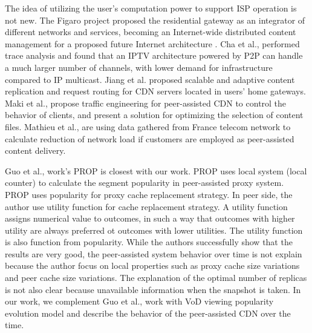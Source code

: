\documentclass[10pt,final,journal,a4paper]{IEEEtran}
\begin{document}
The idea of utilizing the user's computation power to support ISP operation is not new.  
The Figaro project \cite{figaro} proposed the residential gateway as an integrator of different networks and services, becoming an Internet-wide distributed content management for a proposed future Internet architecture \cite{figaro}.  
Cha et al.,\cite{Cha:2008:NTP:1855641.1855646} performed trace analysis and found that an IPTV architecture powered by P2P can handle a much larger number of channels, with lower demand for infrastructure compared to IP multicast.  
Jiang et al. \cite{Jiang:2012:OMD:2413176.2413193} proposed scalable and adaptive content replication and request routing for CDN servers located in users' home gateways.  
Maki et al.,\cite{NaoyaMAKI2012} propose traffic engineering for peer-assisted CDN to control the behavior of clients, and present a solution for optimizing the selection of content files.
Mathieu et al., \cite{6249305} are using data gathered from France telecom network to calculate reduction of network load if customers are employed as peer-assisted content delivery.

Guo et al., \cite{1613869} work's PROP is closest with our work.
PROP uses local system (local counter) to calculate the segment popularity in peer-assisted proxy system. 
PROP uses popularity for proxy cache replacement strategy. 
In peer side, the author use utility function for cache replacement strategy.
A utility function assigns numerical value to outcomes, in such a way that outcomes with higher utility are always preferred ot outcomes with lower utilities.
The utility function is also function from popularity.
While the authors successfully show that the results are very good, the peer-assisted system behavior over time is not explain because the author focus on local properties such as proxy cache size variations and peer cache size variations.
The explanation of the optimal number of replicas is not also clear because unavailable information when the snapshot is taken.  
In our work, we complement Guo et al., \cite{1613869} work with VoD viewing popularity evolution model and describe the behavior of the peer-assisted CDN over the time.
\end{document}
